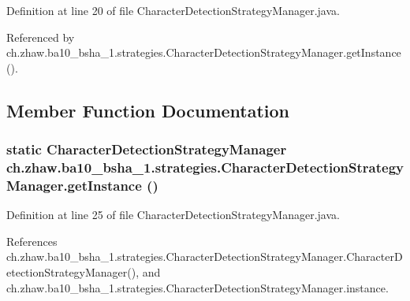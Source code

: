 Definition at line 20 of file CharacterDetectionStrategyManager.java.

Referenced by ch.zhaw.ba10\_\-bsha\_\-1.strategies.CharacterDetectionStrategyManager.getInstance().

\subsection{Member Function Documentation}
\hypertarget{classch_1_1zhaw_1_1ba10__bsha__1_1_1strategies_1_1CharacterDetectionStrategyManager_a380560b40e543ce6b16f7537874e8617}{
\subsubsection[{getInstance}]{\setlength{\rightskip}{0pt plus 5cm}static {\bf CharacterDetectionStrategyManager} ch.zhaw.ba10\_\-bsha\_\-1.strategies.CharacterDetectionStrategyManager.getInstance ()}}
\label{classch_1_1zhaw_1_1ba10__bsha__1_1_1strategies_1_1CharacterDetectionStrategyManager_a380560b40e543ce6b16f7537874e8617}


Definition at line 25 of file CharacterDetectionStrategyManager.java.

References ch.zhaw.ba10\_\-bsha\_\-1.strategies.CharacterDetectionStrategyManager.CharacterDetectionStrategyManager(), and ch.zhaw.ba10\_\-bsha\_\-1.strategies.CharacterDetectionStrategyManager.instance.

